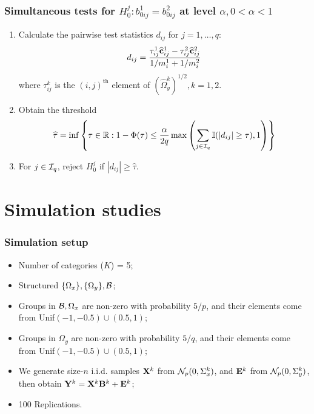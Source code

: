 \documentclass[10pt]{beamer}
\theoremstyle{definition}
\DeclareMathOperator*{\Th}{\text{th}}
\begin{document}
\begin{frame}
\frametitle{Simultaneous tests for $H_0^{j}: b_{0 ij}^1 = b_{0 ij}^2$ at level $\alpha, 0< \alpha< 1$}

\begin{enumerate}
\item Calculate the pairwise test statistics $d_{ij}$ for $j = 1, \ldots, q$:
%
\[
d_{ij} = \frac{\tau_{ij}^1 \widehat {{\bf{c}}}_{ij}^1 - \tau_{ij}^2 \widehat {{\bf{c}}}_{ij}^2}{1/m_i^1 + 1/m_i^2}
\]
%
where $\tau_{ij}^k$ is the $(i,j)^{\Th}$ element of $(\widehat \Omega_y^k)^{1/2}, k=1,2$.

\item Obtain the threshold
%
$$
\widehat \tau = \inf \left\{\tau \in {\mathbb{R}}: 1 - \Phi(\tau) \leq \frac{\alpha}{2 q}
\max \left( \sum_{j \in {\cal{I}}_q} {\mathbb{I}}( |d_{ij}| \geq \tau), 1 \right) \right\}
$$
%

\item For $j \in {\cal{I}}_q$, reject $H_0^{j}$ if $|d_{ij}| \geq \widehat \tau$.
\end{enumerate} 

\end{frame}
\section{Simulation studies}

\begin{frame}
\frametitle{Simulation setup}
\begin{itemize}
\item Number of categories ($K$) = 5;

\item Structured $\{ \Omega_x\}, \{\Omega_y\}, {\cal{B}}$;

\item Groups in ${\cal{B}},\Omega_x$ are non-zero with probability $5/p$, and their elements come from Unif$(-1, -0.5) \cup (0.5,1)$;

\item Groups in $\Omega_y$ are non-zero with probability $5/q$, and their elements come from Unif$(-1, -0.5) \cup (0.5,1)$;

\item We generate size-$n$ i.i.d. samples ${\mathbf{X}}^k$ from ${\cal{N}}_p(0, \Sigma_x^k)$, and ${\mathbf{E}}^k$ from ${\cal{N}}_p(0, \Sigma_y^k)$, then obtain ${\mathbf{Y}}^k = {\mathbf{X}}^k {\mathbf{B}}^k + {\mathbf{E}}^k$;
\item 100 Replications.

\end{itemize}
\end{frame}
\end{document}
